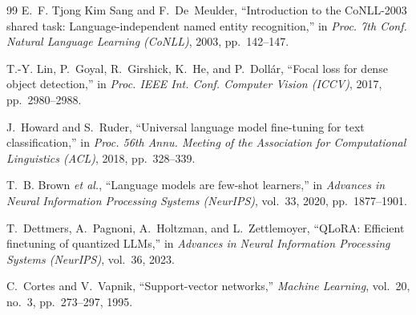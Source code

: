 \documentclass[journal]{IEEEtran}
\begin{document}
\begin{thebibliography}{99}
E.~F. Tjong Kim Sang and F.~De~Meulder,
``Introduction to the CoNLL-2003 shared task: Language-independent named
entity recognition,''
in \emph{Proc. 7th Conf. Natural Language Learning (CoNLL)}, 2003,
pp.~142--147.

T.-Y. Lin, P.~Goyal, R.~Girshick, K.~He, and P.~Doll\'ar,
``Focal loss for dense object detection,''
in \emph{Proc. IEEE Int. Conf. Computer Vision (ICCV)}, 2017,
pp.~2980--2988.

J.~Howard and S.~Ruder,
``Universal language model fine-tuning for text classification,''
in \emph{Proc. 56th Annu. Meeting of the Association for Computational
Linguistics (ACL)}, 2018, pp.~328--339.

T.~B. Brown \emph{et al.},
``Language models are few-shot learners,''
in \emph{Advances in Neural Information Processing Systems (NeurIPS)},
vol.~33, 2020, pp.~1877--1901.

T.~Dettmers, A.~Pagnoni, A.~Holtzman, and L.~Zettlemoyer,
``QLoRA: Efficient finetuning of quantized LLMs,''
in \emph{Advances in Neural Information Processing Systems (NeurIPS)},
vol.~36, 2023.

C.~Cortes and V.~Vapnik,
``Support-vector networks,''
\emph{Machine Learning}, vol.~20, no.~3, pp.~273--297, 1995.

\end{thebibliography}

% 







\end{document}
